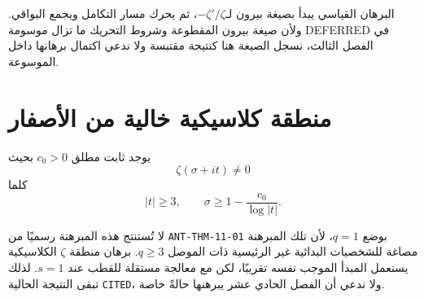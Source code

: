 البرهان القياسي يبدأ بصيغة بيرون لـ\(-\zeta'/\zeta\)، ثم يحرك مسار
التكامل ويجمع البواقي. ولأن صيغة بيرون المقطوعة وشروط التحريك ما تزال
موسومة \textenglish{DEFERRED} في الفصل الثالث، نسجل الصيغة هنا كنتيجة
مقتبسة ولا ندعي اكتمال برهانها داخل الموسوعة.

\begin{antfigure}
\caption{المنحنى الأزرق: تذبذب \(\psi_0(x)-x\) الدقيق، محسوب مباشرة من
\(\Lambda(n)\) لكل \(n\le100\). المنحنى الأحمر المتقطع: تقريب الصيغة
الصريحة عند اقتطاعها إلى أول عشرة أصفار غير بديهية فقط (الجزء~\(6.9\)
أعلاه)، مع الحدين الثابتين \(-\log(2\pi)\) و\(-\tfrac12\log(1-x^{-2})\).
التباعد الظاهر بين المنحنيين متوقع ومقصود تعليميًا: تقارب الصيغة الصريحة
إلى القيمة الدقيقة يتطلب مجموعًا على عدد كبير من الأصفار، لا عشرة فقط؛
فالشكل يوضّح طبيعة التذبذب لا دقة الاقتطاع.}
\label{fig:psi-oscillation-explicit-formula}
\end{antfigure}

\section{منطقة كلاسيكية خالية من الأصفار}

\begin{theorem}
\label{thm:zeta-classical-zero-free-region}
يوجد ثابت مطلق \(c_0>0\) بحيث
\[
\zeta(\sigma+it)\neq0
\]
كلما
\[
|t|\geq3,
\qquad
\sigma\geq
1-\frac{c_0}{\log|t|}.
\]
\end{theorem}

\begin{remark}
لا تُستنتج هذه المبرهنة رسميًا من
\textenglish{\texttt{ANT-THM-11-01}} بوضع \(q=1\)، لأن تلك المبرهنة
مصاغة للشخصيات البدائية غير الرئيسية ذات الموصل \(q\ge3\).
برهان منطقة \(\zeta\) الكلاسيكية يستعمل المبدأ الموجب نفسه تقريبًا،
لكن مع معالجة مستقلة للقطب عند \(s=1\). لذلك تبقى النتيجة الحالية
\textenglish{\texttt{CITED}}، ولا ندعي أن الفصل الحادي عشر يبرهنها
حالةً خاصة.
\end{remark}

